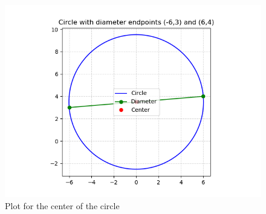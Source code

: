 \documentclass{beamer}
\begin{document}
 \begin{figure}
     \centering
     \includegraphics[width=0.5\linewidth]{figs/fig2.png}
     \caption{Plot for the center of the circle}
     \label{fig2}
 \end{figure}
\end{document}
